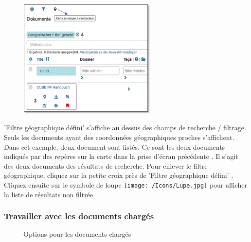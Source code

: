 \begin{figure}
  \vspace{-25pt}
  \begin{center}
    \includegraphics[height=60mm]{../chapters/11_Dokumentenablage/pictures/11-2-3_GeoBereichResult.jpg}
  \end{center}
  \vspace{-20pt}
  \vspace{-10pt}
\end{figure}
'Filtre géographique défini' s'affiche au dessus des champs de recherche / filtrage. Seuls les documents ayant des coordonnées géographiques proches s'affichent. Dans cet exemple, deux document sont listés. Ce sont les deux documents indiqués par des repères sur la carte dans la prise d'écran précédente . Il s'agit des deux documents des résultats de recherche. Pour enlever le filtre géographique, cliquez sur la petite croix près de 'Filtre géographique défini' . Cliquez ensuite sur le symbole de loupe \texttt{[image: /Icons/Lupe.jpg]} pour afficher la liste de résultats non filtrée.

\subsubsection{Travailler avec les documents chargés}
\label{bkm:Ref442801819}

\begin{figure}[H]
\caption{Options pour les documents chargés}
\end{figure}

